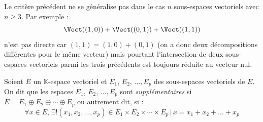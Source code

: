 \documentclass[french,11pt,twoside]{VcCours}
\begin{document}
\begin{Remarque}{} Le critère précédent ne se généralise pas dans le cas $n$ sous-espaces vectoriels avec $n \geq 3$. Par exemple :
$$ \Vect((1,0)) + \Vect((0,1)) + \Vect((1,1)) $$
n'est pas directe car $(1,1)= (1,0) + (0,1)$ (on a donc deux décompositions différentes pour le même vecteur) mais pourtant l'intersection de deux sous-espaces vectoriels parmi les trois précédents est toujours réduite au vecteur nul.
\end{Remarque}


\begin{Definition}{}
Soient $E$ un $\mathbb{K}$-espace vectoriel et $E_1$, $E_2$, $\ldots, E_p$ des sous-espaces vectoriels de $E$.  On dit que les espaces $E_1$, $E_2$, $\ldots, E_p$ sont \emph{supplémentaires} si $E = E_1 \oplus E_2 \oplus \cdots \oplus E_p$ ou autrement dit, si :
$$ \forall x \in E, \, \exists ! (x_1, x_2, \ldots, x_p) \in E_1 \times E_2 \times \cdots \times E_p \, \vert \, x= x_1 + x_2 + \ldots + x_p$$
\vspace{1cm}
\end{Definition}
\medskip
\end{document}
